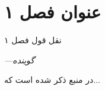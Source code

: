 \chapter{عنوان فصل ۱}
\setlength{\epigraphwidth}{0.3\textwidth}
\epigraph{نقل قول فصل ۱}{\textit{—گوینده}}
\setcounter{footnote}{0}
در منبع
\cite{rizzi_relativity_2004}
ذکر شده است که...
